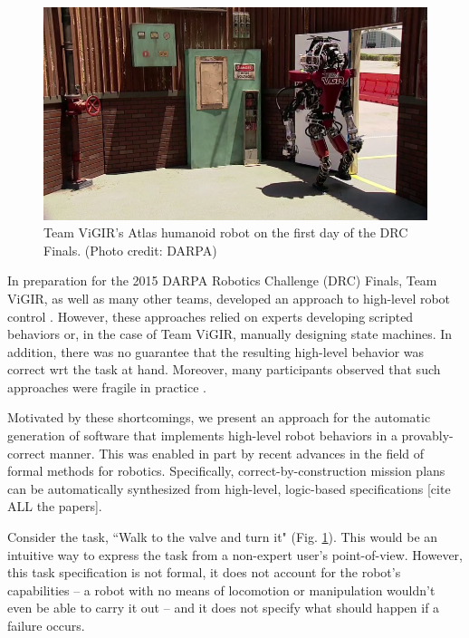 
\begin{figure}[t]
\centering
\includegraphics[width=0.99\columnwidth,clip]{./img/atlas_door_finals.png}
\caption{Team ViGIR's Atlas humanoid robot on the first day of the DRC Finals. (Photo credit: DARPA)
}
\label{Fig:AtlasDoorFinals}
\end{figure}

In preparation for the 2015 DARPA Robotics Challenge (DRC) Finals, Team ViGIR, as well as many other teams, developed an approach to high-level robot control \cite{Philipp2013Bsc, Philipp2015Msc}.
However, these approaches relied on experts developing scripted behaviors or, in the case of Team ViGIR, manually designing state machines.
In addition, there was no guarantee that the resulting high-level behavior was correct \ac{wrt} the task at hand.
Moreover, many participants observed that such approaches were fragile in practice \cite{DRC-what-happened}.

Motivated by these shortcomings, we present an approach for the automatic generation of software that implements high-level robot behaviors in a provably-correct manner.
This was enabled in part by recent advances in the field of formal methods for robotics.
Specifically, correct-by-construction mission plans can be automatically synthesized from high-level, logic-based specifications [cite ALL the papers].

\begin{myExample}\label{Ex:PickupObject}
	Consider the task, ``Walk to the valve and turn it" (Fig. \ref{Fig:AtlasDoorFinals}).
	This would be an intuitive way to express the task from a non-expert user's point-of-view.
	However, this task specification is not formal, it does not account for the robot's capabilities -- a robot with no means of locomotion or manipulation wouldn't even be able to carry it out -- and it does not specify what should happen if a failure occurs. %
\end{myExample}

